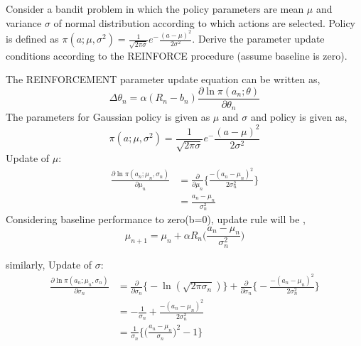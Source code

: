 \documentclass[solution,addpoints,12pt]{exam}
\begin{document}
\begin{questions}
\question[3]
Consider a bandit problem in which the policy parameters are mean $ \mu$ and variance $\sigma$ of normal distribution according to which actions are selected. Policy is defined as $ \pi(a;\mu,\sigma^2) = \frac{1}{\sqrt{2\pi\sigma}}e^-\frac{(a-\mu)^2}{2\sigma^2}$. Derive the parameter update conditions according to the REINFORCE procedure (assume baseline is zero).

\begin{solution}
The REINFORCEMENT parameter update equation can be written as,\\
\begin{equation}
	\Delta \theta_n = \alpha (R_n - b_n) \frac{\partial \ln \pi(a_n;\theta)}{\partial \theta_n}
\end{equation}
The parameters for Gaussian policy is given as $\mu$ and $\sigma$ and policy is given as,
\begin{equation}
	\pi(a;\mu,\sigma^2) = \frac{1}{\sqrt{2\pi\sigma}}e^-\frac{(a-\mu)^2}{2\sigma^2}
\end{equation}
Update of $\mu$:
\begin{equation}
\begin{aligned}
\frac{\partial \ln \pi(a_n;\mu_n,\sigma_n)}{\partial \mu_n} &= \frac{\partial}{\partial\mu_n} \bigg\{ \frac{-(a_n -\mu_n)^2}{2\sigma_n^2}\bigg\}\\
& = \frac{a_n-\mu_n}{\sigma_n^2}
\end{aligned}
\end{equation}
Considering baseline performance to zero(b=0), update rule will be ,
\begin{equation}
	\mu_{n+1} = \mu_{n} + \alpha R_n \bigg(\frac{a_n-\mu_n}{\sigma_n^2}\bigg)
\end{equation}

similarly,
Update of $\sigma$:
\begin{equation}
\begin{aligned}
\frac{\partial \ln \pi(a_n;\mu_n,\sigma_n)}{\partial \sigma_n} &= \frac{\partial}{\partial\sigma_n} \bigg\{ -\ln (\sqrt{2\pi\sigma_n})\bigg\}+ \frac{\partial}{\partial \sigma_n}\bigg\{- \frac{-(a_n -\mu_n)^2}{2\sigma_n^2} \bigg\}\\
&= - \frac{1}{\sigma_n} +\frac{-(a_n -\mu_n)^2}{2\sigma_n^2}\\
&= \frac{1}{\sigma_n} \bigg\{ \bigg(\frac{a_n -\mu_n}{\sigma_n}\bigg)^2 - 1 \bigg\}
\end{aligned}
\end{equation}


\end{solution}
\end{questions}
\end{document}
